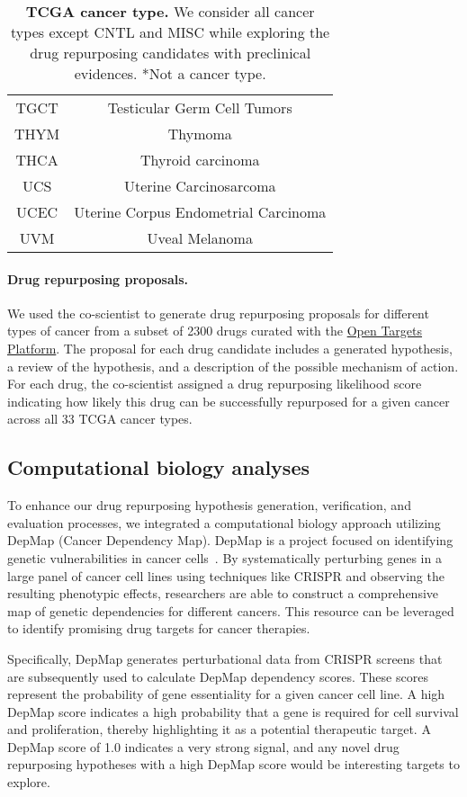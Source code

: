 \begin{table}[ht!]
\begin{tabular}{cc}
TGCT & Testicular Germ Cell Tumors \\
THYM & Thymoma \\
THCA & Thyroid carcinoma \\
UCS & Uterine Carcinosarcoma \\
UCEC & Uterine Corpus Endometrial Carcinoma \\
UVM & Uveal Melanoma \\
\bottomrule
\end{tabular}
\vspace{0.1cm}
\caption{\textbf{TCGA cancer type.} We consider all cancer types except CNTL and MISC while exploring the drug repurposing candidates with preclinical evidences. *Not a cancer type.}
\label{tab:cancer_type}
\end{table}

\paragraph{Drug repurposing proposals.}
We used the co-scientist to generate drug repurposing proposals for different types of cancer from a subset of 2300 drugs curated with the \href{https://platform.opentargets.org/downloads}{Open Targets Platform}. The proposal for each drug candidate includes a generated hypothesis, a review of the hypothesis, and a description of the possible mechanism of action. For each drug, the co-scientist assigned a drug repurposing likelihood score indicating how likely this drug can be successfully repurposed for a given cancer across all 33 TCGA cancer types.


\subsection{Computational biology analyses}
\label{sec:eval_compbio}
To enhance our drug repurposing hypothesis generation, verification, and evaluation processes, we integrated a computational biology approach utilizing DepMap (Cancer Dependency Map). DepMap is a project focused on identifying genetic vulnerabilities in cancer cells~\citep{depmap2024}. By systematically perturbing genes in a large panel of cancer cell lines using techniques like CRISPR and observing the resulting phenotypic effects, researchers are able to construct a comprehensive map of genetic dependencies for different cancers. This resource can be leveraged to identify promising drug targets for cancer therapies.

Specifically, DepMap generates perturbational data from CRISPR screens that are subsequently used to calculate DepMap dependency scores. These scores represent the probability of gene essentiality for a given cancer cell line. A high DepMap score indicates a high probability that a gene is required for cell survival and proliferation, thereby highlighting it as a potential therapeutic target. A DepMap score of 1.0 indicates a very strong signal, and any novel drug repurposing hypotheses with a high DepMap score would be interesting targets to explore.

